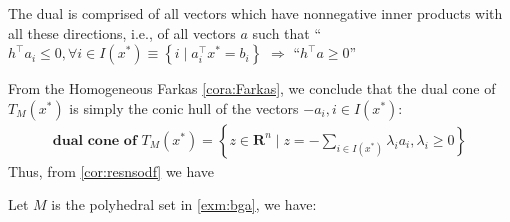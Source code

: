 \documentclass{article}
\begin{document}
The dual is comprised of all vectors which have nonnegative inner products with all these directions, i.e., of
all vectors $a$ such that `` $h^{\top} a_{i} \leq 0, \forall i \in I\left(x^{*}\right) \equiv\left\{i \mid a_{i}^{\top} x^{*}=b_{i}\right\}$ $\Rightarrow$  ``$h^{\top} a \geq 0$''

From the Homogeneous Farkas \cref{cora:Farkas}, we conclude that the dual cone of $T_{M}\left(x^{*}\right)$ is simply the conic hull of the vectors $-a_{i}, i \in I\left(x^{*}\right):$
\begin{align*}
 \textbf{dual cone of $T_{M}\left(x^{*}\right)$}=\left\{z \in \mathbf{R}^{n} \mid z=-\sum_{i \in I\left(x^{*}\right)} \lambda_{i} a_{i}, \lambda_{i} \geq 0\right\}
\end{align*}
Thus, from \cref{cor:resnsodf} we have
\begin{cora}\label{cora:polya} Let $M$ is the polyhedral set in \cref{exm:bga}, we have: 
\end{cora}
\end{document}
